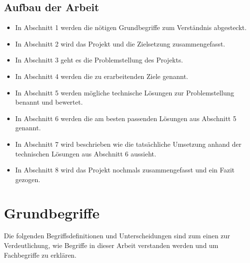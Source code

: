 \documentclass[a4paper,11pt,singlespacing]{article}
\begin{document}
	\subsection{Aufbau der Arbeit}\label{sec:EinleitungAufbau}
		\begin{itemize}
			\item In Abschnitt 1 werden die nötigen Grundbegriffe zum Verständnis abgesteckt.
			\item In Abschnitt 2 wird das Projekt und die Zielsetzung zusammengefasst.
			\item In Abschnitt 3 geht es die Problemstellung des Projekts.
			\item In Abschnitt 4 werden die zu erarbeitenden Ziele genannt.
			\item In Abschnitt 5 werden mögliche technische Lösungen zur Problemstellung benannt und bewertet.
			\item In Abschnitt 6 werden die am besten passenden Lösungen aus Abschnitt 5 genannt.
			\item In Abschnitt 7 wird beschrieben wie die tatsächliche Umsetzung anhand der technischen Lösungen aus Abschnitt 6 aussieht.
			\item In Abschnitt 8 wird das Projekt nochmals zusammengefasst und ein Fazit gezogen.
		\end{itemize}

\newpage

\section{Grundbegriffe}\label{sec:Grundbegriffe}
	Die folgenden Begriffsdefinitionen und Unterscheidungen sind zum einen zur Verdeutlichung, wie Begriffe in dieser Arbeit verstanden werden und um Fachbegriffe zu erklären.
\end{document}
